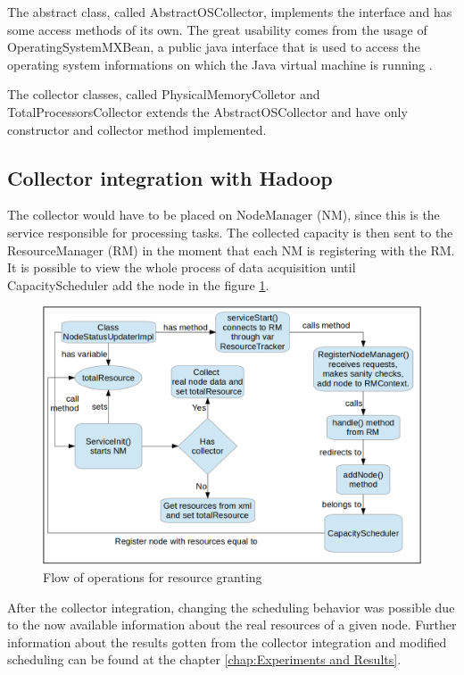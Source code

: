 The abstract class, called AbstractOSCollector, implements the interface and has some access methods of its own. The great usability comes from the usage of OperatingSystemMXBean, a public java interface that is used to access the operating system informations on which the Java virtual machine is running \cite{MXBean}.

The collector classes, called PhysicalMemoryColletor and TotalProcessorsCollector extends the AbstractOSCollector and have only constructor and collector method implemented.

\subsection{Collector integration with Hadoop}
The collector would have to be placed on NodeManager (NM), since this is the service responsible for processing tasks. The collected capacity is then sent to the ResourceManager (RM) in the moment that each NM is registering with the RM. It is possible to view the whole process of data acquisition until CapacityScheduler add the node in the figure \ref{fig:collectorflow}.

\begin{figure}[!hbtn]
   \renewcommand{\figurename}{Figure}
   \centering
   \includegraphics[width=15cm]{figuras/Figura20-collectorfig.png}
   \caption{Flow of operations for resource granting}
   \label{fig:collectorflow}
\end{figure}

After the collector integration, changing the scheduling behavior was possible due to the now available information about the real resources of a given node. Further information about the results gotten from the collector integration and modified scheduling can be found at the chapter \ref{chap:Experiments and Results}.